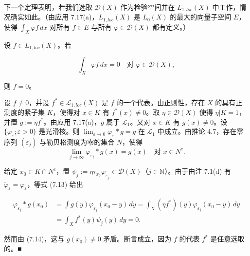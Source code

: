 下一个定理表明，若我们选取 $ \mathcal{D}(X) $ 作为检验空间并在 $ L_{1,loc}(X) $ 中工作，情况确实如此。（由应用 7.17(a)，$ L_{1,loc}(X) $ 是 $ L_{0}(X) $ 的最大的向量子空间 $ E $，使得 $ \int_{X}\varphi f\,dx $ 对所有 $ f \in E $ 与所有 $ \varphi \in \mathcal{D}(X) $ 都有定义。）

\begin{theorem}

设 $ f \in L_{1,loc}(X) $。若

\begin{equation}
\int_{X}\varphi f\,dx = 0 \quad \text{对 } \varphi \in \mathcal{D}(X) ,\tag{7.13}
\end{equation}

则 $ f = 0 $。

\proofhead
设 $ f \ne 0 $，并设 $ f^{\ast} \in \mathcal{L}_{1,loc}(X) $ 是 $ f $ 的一个代表。由正则性，存在 $ X $ 的具有正测度的紧子集 $ K $，使得对 $ x \in K $ 有 $ f^{\ast}(x) \ne 0 $。取 $ \eta \in \mathcal{D}(X) $ 使得 $ \eta|K = 1 $，并置 $ g := \eta f^{\ast} $。由应用 7.17(a)，$ g $ 属于 $ \mathcal{L}_{1} $。又对 $ x \in K $ 有 $ g(x) \ne 0 $。设 $ \{\varphi_{\varepsilon} ; \varepsilon > 0\} $ 是光滑核。则 $ \lim_{\varepsilon \to 0}\varphi_{\varepsilon} * g = g $ 在 $ \mathcal{L}_{1} $ 中成立。由推论 4.7，存在零序列 $ (\varepsilon_{j}) $ 与勒贝格测度为零的集合 $ N $，使得
\begin{equation}
\lim_{j \to \infty}\varphi_{\varepsilon_{j}} * g(x) = g(x) \quad \text{对 } x \in N^{c} .\tag{7.14}
\end{equation}

给定 $ x_{0} \in K \cap N^{c} $，置 $ \psi_{j} := \eta\tau_{x_{0}}\varphi_{\varepsilon_{j}} \in \mathcal{D}(X) $（$ j \in \mathbb{N} $）。由于由注 7.1(d) 有 $ \check{\varphi}_{\varepsilon} = \varphi_{\varepsilon} $，等式 (7.13) 给出

\begin{equation*}
\begin{aligned}
\varphi_{\varepsilon_{j}} * g(x_{0}) &= \int g(y)\varphi_{\varepsilon_{j}}(x_{0} - y)\,dy = \int_{X}(\eta f^{\ast})(y)\varphi_{\varepsilon_{j}}(x_{0} - y)\,dy \\ &= \int_{X}f^{\ast}(y)\psi_{j}(y)\,dy = 0 .
\end{aligned}
\end{equation*}

然而由 (7.14)，这与 $ g(x_{0}) \ne 0 $ 矛盾。断言成立，因为 $ f $ 的代表 $ f^{\ast} $ 是任意选取的。\nobreak\hspace{0.35em}■

\end{theorem}

